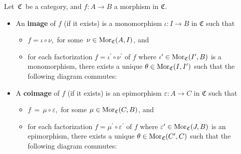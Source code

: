 \vskip 0.5cm
\begin{definition}
\mbox{}
\vskip 0.15cm
\noindent
Let \,$\mathfrak{C}$\, be a category, and $f : A \longrightarrow B$ a morphism in $\mathfrak{C}$.
\begin{itemize}
\item
	\vskip -0.1cm
	An \textbf{image} of $f$ (if it exists) is a monomorphism $\iota : I \longrightarrow B$ in $\mathfrak{C}$ such that
	\begin{itemize}
	\item
		$f = \iota \circ \nu$,\, for some \,$\nu \in \textnormal{Mor}_{\mathfrak{C}}(A,I)$, and
	\item
		for each factorization $f = \iota^{\prime} \circ \nu^{\prime}$ of $f$
		where $\iota^{\prime} \in \textnormal{Mor}_{\mathfrak{C}}(I^{\prime},B)$ is a monomorphism,
		there exists a unique $\theta \in \textnormal{Mor}_{\mathfrak{C}}(I,I^{\prime})$ such that the following diagram commutes:
		\begin{center}
		\end{center}
	\end{itemize}
\item
	A \textbf{coimage} of $f$ (if it exists) is an epimorphism $\varepsilon : A \longrightarrow C$ in $\mathfrak{C}$ such that
	\begin{itemize}
	\item
		$f \,=\, \mu \circ \varepsilon$,\, for some $\mu \in \textnormal{Mor}_{\mathfrak{C}}(C,B)$, and
	\item
		for each factorization $f = \mu^{\prime} \circ \varepsilon^{\prime}$ of $f$
		where $\varepsilon^{\prime} \in \textnormal{Mor}_{\mathfrak{C}}(J,B)$ is an epimorphism,
		there exists a unique $\theta \in \textnormal{Mor}_{\mathfrak{C}}(C^{\prime},C)$ such that the following diagram commutes:
		\begin{center}
		\end{center}
	\end{itemize}
\end{itemize}
\end{definition}


